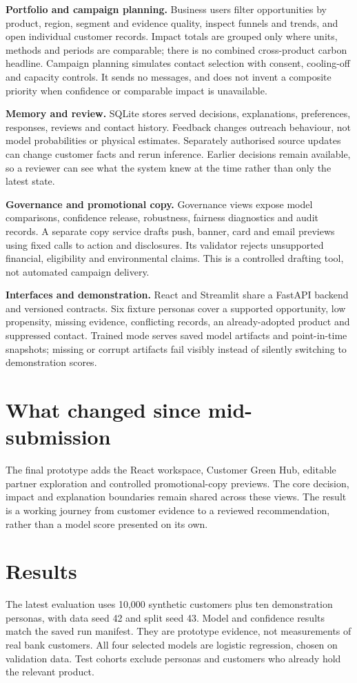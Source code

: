 \documentclass[10pt,a4paper]{article}
\begin{document}
\textbf{Portfolio and campaign planning.} Business users filter opportunities by product, region, segment and evidence quality, inspect funnels and trends, and open individual customer records. Impact totals are grouped only where units, methods and periods are comparable; there is no combined cross-product carbon headline. Campaign planning simulates contact selection with consent, cooling-off and capacity controls. It sends no messages, and does not invent a composite priority when confidence or comparable impact is unavailable.

\textbf{Memory and review.} SQLite stores served decisions, explanations, preferences, responses, reviews and contact history. Feedback changes outreach behaviour, not model probabilities or physical estimates. Separately authorised source updates can change customer facts and rerun inference. Earlier decisions remain available, so a reviewer can see what the system knew at the time rather than only the latest state.

\textbf{Governance and promotional copy.} Governance views expose model comparisons, confidence release, robustness, fairness diagnostics and audit records. A separate copy service drafts push, banner, card and email previews using fixed calls to action and disclosures. Its validator rejects unsupported financial, eligibility and environmental claims. This is a controlled drafting tool, not automated campaign delivery.

\textbf{Interfaces and demonstration.} React and Streamlit share a FastAPI backend and versioned contracts. Six fixture personas cover a supported opportunity, low propensity, missing evidence, conflicting records, an already-adopted product and suppressed contact. Trained mode serves saved model artifacts and point-in-time snapshots; missing or corrupt artifacts fail visibly instead of silently switching to demonstration scores.

\section{What changed since mid-submission}
The final prototype adds the React workspace, Customer Green Hub, editable partner exploration and controlled promotional-copy previews. The core decision, impact and explanation boundaries remain shared across these views. The result is a working journey from customer evidence to a reviewed recommendation, rather than a model score presented on its own.

\newpage
\section{Results}
The latest evaluation uses 10,000 synthetic customers plus ten demonstration personas, with data seed 42 and split seed 43. Model and confidence results match the saved run manifest. They are prototype evidence, not measurements of real bank customers. All four selected models are logistic regression, chosen on validation data. Test cohorts exclude personas and customers who already hold the relevant product.
\end{document}
